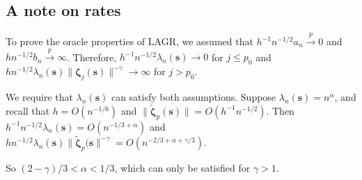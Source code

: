\documentclass[authoryear, review, 11pt]{elsarticle}
\begin{document}
        \subsection{A note on rates}
        To prove the oracle properties of LAGR, we assumed that $h^{-1} n^{-1/2} a_n \xrightarrow{p} 0$ and $h n^{-1/2} b_n \xrightarrow{p} \infty$. Therefore, $h^{-1} n^{-1/2} \lambda_n(\bm{s})  \to 0$ for $j \le p_0$ and $h n^{-1/2} \lambda_n(\bm{s}) \| \bm{\zeta}_j(\bm{s}) \|^{-\gamma} \to \infty$ for $j > p_0$.
        
        We require that $\lambda_n(\bm{s})$ can satisfy both assumptions. Suppose $\lambda_n(\bm{s}) = n^{\alpha}$, and recall that $h = O(n^{-1/6})$ and $ \| \tilde{\bm{\zeta}}_p(\bm{s}) \| = O(h^{-1} n^{-1/2})$. Then $h^{-1} n^{-1/2} \lambda_n(\bm{s}) = O(n^{-1/3 + \alpha})$ and $h n^{-1/2} \lambda_n(\bm{s})  \| \tilde{\bm{\zeta}}_p(\bm{s} \|^{-\gamma} = O(n^{-2/3 + \alpha + \gamma/3})$.
        
        So $ (2 - \gamma)/3 < \alpha < 1/3 $, which can only be satisfied for $\gamma > 1$.

\appendix
\end{document}
